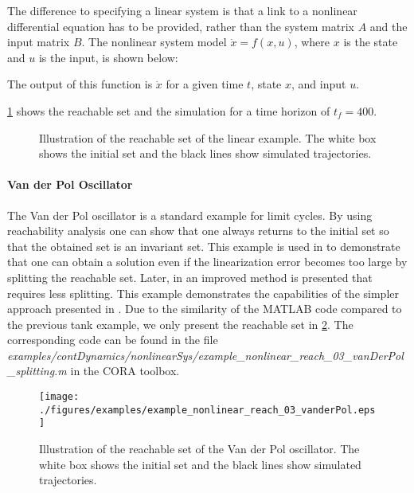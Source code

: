 The difference to specifying a linear system is that a link to a nonlinear differential equation has to be provided, rather than the system matrix $A$ and the input matrix $B$. The nonlinear system model $\dot{x}=f(x,u)$, where $x$ is the state and $u$ is the input, is shown below:
    {\small
}

The output of this function is $\dot{x}$ for a given time $t$, state $x$, and input $u$.

\cref{fig:example_nonlinear_reach_01_tank} shows the reachable set and the simulation for a time horizon of $t_f = 400$.
\begin{figure}[htb]
    \centering
    \footnotesize
    \caption{Illustration of the reachable set of the linear example. The white box shows the initial set and the black lines show simulated trajectories.}
    \label{fig:example_nonlinear_reach_01_tank}
\end{figure}

\paragraph{Van der Pol Oscillator}
The Van der Pol oscillator is a standard example for limit cycles. By using reachability analysis one can show that one always returns to the initial set so that the obtained set is an invariant set. This example is used in \cite{Althoff2008c} to demonstrate that one can obtain a solution even if the linearization error becomes too large by splitting the reachable set. Later, in \cite{Althoff2013a} an improved method is presented that requires less splitting. This example demonstrates the capabilities of the simpler approach presented in \cite{Althoff2008c}. Due to the similarity of the MATLAB code compared to the previous tank example, we only present the reachable set in \cref{fig:example_nonlinear_reach_03_vanderPol}. The corresponding code can be found in the file \textit{examples/contDynamics/nonlinearSys/}\textit{example\_nonlinear\_reach\_03\_vanDerPol\_splitting.m} in the CORA toolbox.
\begin{figure}[htb]
    \centering
    \footnotesize
    \texttt{[image: ./figures/examples/example\_nonlinear\_reach\_03\_vanderPol.eps]}
    \caption{Illustration of the reachable set of the Van der Pol oscillator. The white box shows the initial set and the black lines show simulated trajectories.}
    \label{fig:example_nonlinear_reach_03_vanderPol}
\end{figure}

